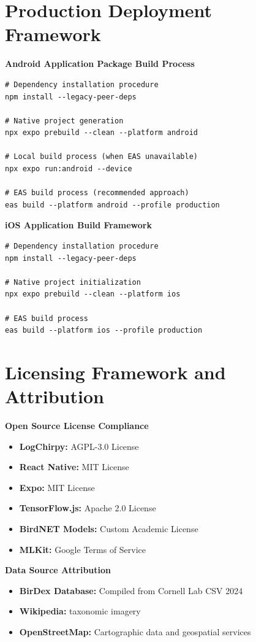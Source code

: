 \section{Production Deployment Framework}

\textbf{Android Application Package Build Process}
\begin{lstlisting}[caption=Android Build Process, label=lst:android_build]
# Dependency installation procedure
npm install --legacy-peer-deps

# Native project generation
npx expo prebuild --clean --platform android

# Local build process (when EAS unavailable)
npx expo run:android --device

# EAS build process (recommended approach)
eas build --platform android --profile production
\end{lstlisting}

\textbf{iOS Application Build Framework}
\begin{lstlisting}[caption=iOS Build Process, label=lst:ios_build]
# Dependency installation procedure
npm install --legacy-peer-deps

# Native project initialization
npx expo prebuild --clean --platform ios

# EAS build process
eas build --platform ios --profile production
\end{lstlisting}

\section{Licensing Framework and Attribution}

\textbf{Open Source License Compliance}
\begin{itemize}
    \item \textbf{LogChirpy:} AGPL-3.0 License
    \item \textbf{React Native:} MIT License
    \item \textbf{Expo:} MIT License
    \item \textbf{TensorFlow.js:} Apache 2.0 License
    \item \textbf{BirdNET Models:} Custom Academic License
    \item \textbf{MLKit:} Google Terms of Service
\end{itemize}

\textbf{Data Source Attribution}
\begin{itemize}
    \item \textbf{BirDex Database:} Compiled from Cornell Lab CSV 2024
    \item \textbf{Wikipedia:} taxonomic imagery
    \item \textbf{OpenStreetMap:} Cartographic data and geospatial services
\end{itemize}

